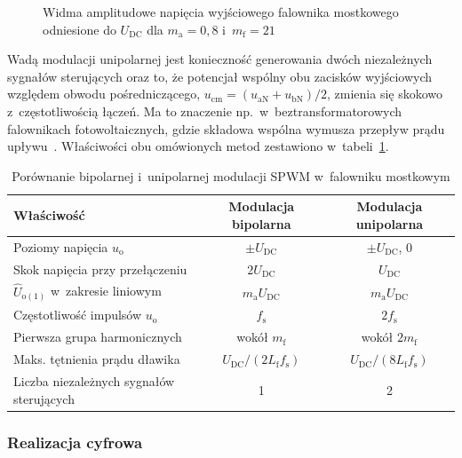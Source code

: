 \begin{figure}[htbp]
  \centering
  
  \caption{Widma amplitudowe napięcia wyjściowego falownika mostkowego
    odniesione do $U_\mathrm{DC}$ dla $m_\mathrm{a} = 0{,}8$
    i~$m_\mathrm{f} = 21$}
  \label{fig:widma}
\end{figure}

Wadą modulacji unipolarnej jest konieczność generowania dwóch niezależnych
sygnałów sterujących oraz to, że potencjał wspólny obu zacisków wyjściowych
względem obwodu pośredniczącego, $u_\mathrm{cm} = (u_\mathrm{aN} +
u_\mathrm{bN})/2$, zmienia się skokowo z~częstotliwością łączeń. Ma to
znaczenie np.~w~beztransformatorowych falownikach fotowoltaicznych, gdzie
składowa wspólna wymusza przepływ prądu upływu~\cite[s.~5--15]{teodorescu2011}. Właściwości obu omówionych metod zestawiono
w~tabeli~\ref{tab:porownanie-pwm}.

\begin{table}[htbp]
  \centering
  \caption{Porównanie bipolarnej i~unipolarnej modulacji SPWM w~falowniku mostkowym}
  \label{tab:porownanie-pwm}
  \begin{tabular}{lcc}
    \toprule
    Właściwość & Modulacja bipolarna & Modulacja unipolarna \\
    \midrule
    Poziomy napięcia $u_\mathrm{o}$ & $\pm U_\mathrm{DC}$ & $\pm U_\mathrm{DC}$, $0$ \\
    Skok napięcia przy przełączeniu & $2U_\mathrm{DC}$ & $U_\mathrm{DC}$ \\
    $\hat U_{\mathrm{o}(1)}$ w~zakresie liniowym & $m_\mathrm{a}U_\mathrm{DC}$ & $m_\mathrm{a}U_\mathrm{DC}$ \\
    Częstotliwość impulsów $u_\mathrm{o}$ & $f_\mathrm{s}$ & $2f_\mathrm{s}$ \\
    Pierwsza grupa harmonicznych & wokół $m_\mathrm{f}$ & wokół $2m_\mathrm{f}$ \\
    Maks. tętnienia prądu dławika & $U_\mathrm{DC}/(2L_\mathrm{f}f_\mathrm{s})$
      & $U_\mathrm{DC}/(8L_\mathrm{f}f_\mathrm{s})$ \\
    Liczba niezależnych sygnałów sterujących & 1 & 2 \\
    \bottomrule
  \end{tabular}
\end{table}

\subsubsection*{Realizacja cyfrowa}

